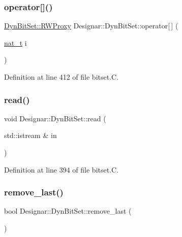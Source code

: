 \subsubsection{\texorpdfstring{operator[]()}{operator[]()}\hspace{0.1cm}{\footnotesize\ttfamily [2/2]}}
{\footnotesize\ttfamily \hyperlink{class_designar_1_1_dyn_bit_set_1_1_r_w_proxy}{Dyn\+Bit\+Set\+::\+R\+W\+Proxy} Designar\+::\+Dyn\+Bit\+Set\+::operator\mbox{[}$\,$\mbox{]} (\begin{DoxyParamCaption}\item[{\hyperlink{namespace_designar_aa72662848b9f4815e7bf31a7cf3e33d1}{nat\+\_\+t}}]{i }\end{DoxyParamCaption})}



Definition at line 412 of file bitset.\+C.

\mbox{\label{class_designar_1_1_dyn_bit_set_a18b74c7e27d2af9fefd48b1eabfd377d}} 
\subsubsection{\texorpdfstring{read()}{read()}}
{\footnotesize\ttfamily void Designar\+::\+Dyn\+Bit\+Set\+::read (\begin{DoxyParamCaption}\item[{std\+::istream \&}]{in }\end{DoxyParamCaption})}



Definition at line 394 of file bitset.\+C.

\mbox{\label{class_designar_1_1_dyn_bit_set_a0ecc1cd2ec0e273ecaab4c81e769e589}} 
\subsubsection{\texorpdfstring{remove\+\_\+last()}{remove\_last()}}
{\footnotesize\ttfamily bool Designar\+::\+Dyn\+Bit\+Set\+::remove\+\_\+last (\begin{DoxyParamCaption}{ }\end{DoxyParamCaption})}



